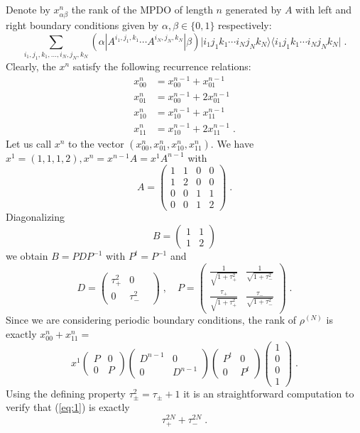 \documentclass{elsarticle}
\newcommand{\be}{\begin{equation}}
\newcommand{\ee}{\end{equation}}
\newcommand{\ket}[1]{\vert#1\rangle}
\newcommand{\bra}[1]{\langle#1\vert}
\begin{document}
Denote by $x^n_{\alpha\beta}$ the rank of the MPDO of length $n$ generated by $A$ with left and right boundary conditions given by $\alpha,\beta\in \{0,1\}$ respectively:
\be
 \sum_{i_1,j_1,k_1,\ldots, i_N,j_N,k_N}(\alpha|A^{i_1,j_1,k_1}\cdots A^{i_N,j_N,k_N}|\beta)\ket{i_1j_1k_1\cdots i_Nj_Nk_N}\bra{i_1j_1k_1\cdots i_Nj_Nk_N}\; .
\ee
Clearly, the $x^n$ satisfy the following recurrence relations:
\begin{align*}
x^n_{00}&=x^{n-1}_{00}+x^{n-1}_{01}\\
x^n_{01}&=x^{n-1}_{00}+2x^{n-1}_{01}\\
x^n_{10}&=x^{n-1}_{10}+x^{n-1}_{11}\\
x^n_{11}&=x^{n-1}_{10}+2x^{n-1}_{11}\; .
\end{align*}
Let us call $x^n$ to the vector $(x^n_{00},x^n_{01},x^n_{10},x^n_{11})$.
We have
$x^1=(1,1,1,2), x^n= x^{n-1}A=x^1 A^{n-1}$ with $$A=\left(\begin{matrix}
1 & 1& 0& 0\\
1 & 2 & 0 & 0\\
0& 0& 1& 1\\
0& 0& 1& 2
\end{matrix}\right)\; .$$
Diagonalizing $$B=\left(\begin{matrix}
1& 1\\
1 & 2
\end{matrix}\right)$$ we obtain $B=PDP^{-1}$ with $P^t=P^{-1}$ and
$$D=\left(\begin{matrix}
\tau_+^2 & 0& \\
0 & \tau_-^2
\end{matrix}\right)\; , \quad P= \left(\begin{matrix}
\frac{1}{\sqrt{1+\tau_+^2}} & \frac{1}{\sqrt{1+\tau_-^2}}\\
\frac{\tau_+}{\sqrt{1+\tau_+^2}} & \frac{\tau_-}{\sqrt{1+\tau_-^2}}
\end{matrix}\right)\; .$$
Since we are considering periodic boundary conditions, the rank of $\rho^{(N)}$ is exactly $x^n_{00}+x^n_{11}=$
\begin{equation}\label{eq:1} x^1 \left(\begin{matrix} P & 0\\
0 & P
\end{matrix}\right)
\left(\begin{matrix}
D^{n-1} & 0 \\
0 & D^{n-1}
\end{matrix}
\right)
\left(\begin{matrix} P^t & 0\\
0 & P^t
\end{matrix}\right)
\left(\begin{matrix}
1\\
0\\
0\\
1
\end{matrix}\right)\; .
\end{equation}
Using the defining property $\tau_\pm^2=\tau_\pm +1$ it is an straightforward computation to verify that (\ref{eq:1}) is exactly $$\tau_+^{2N}+\tau_-^{2N}\; .$$
\end{document}
